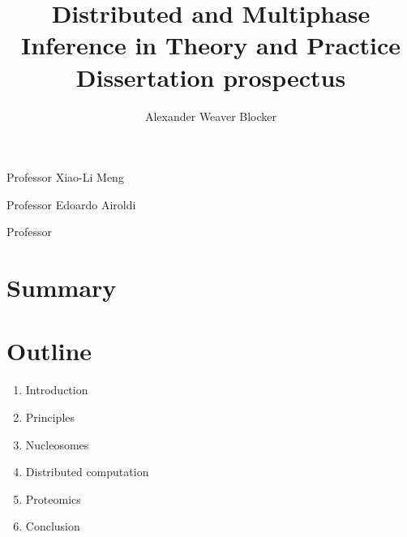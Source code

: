 \documentclass[12pt,letter]{article}
\begin{document}
\title{Distributed and Multiphase Inference in Theory and Practice \\ \large Dissertation prospectus}

\author{Alexander Weaver Blocker}
\date{}
\maketitle

{\fontsize{16}{20}\selectfont

Professor Xiao-Li Meng \hfill \makebox[3in]{\hrulefill}

\vspace{40pt}

Professor Edoardo Airoldi \hfill \makebox[3in]{\hrulefill}

\vspace{40pt}

Professor \hfill \makebox[3in]{\hrulefill}
}

\clearpage

\section*{Summary}



\clearpage

\section*{Outline}

\begin{enumerate}
\item Introduction
\item Principles
\item Nucleosomes
\item Distributed computation
\item Proteomics
\item Conclusion
\end{enumerate}
\end{document}
